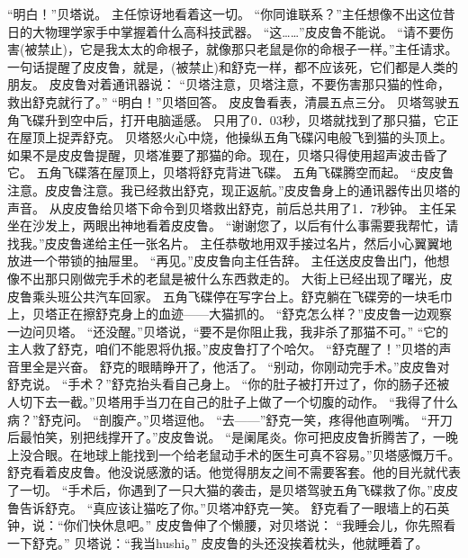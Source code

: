 \documentclass[a4paper,12pt,UTF8,twoside]{ctexbook}
\begin{document}
        “明白！”贝塔说。 
        主任惊讶地看着这一切。 
        “你同谁联系？”主任想像不出这位昔日的大物理学家手中掌握着什么高科技武器。 
        “这……”皮皮鲁不能说。 
        “请不要伤害(被禁止)，它是我太太的命根子，就像那只老鼠是你的命根子一样。”主任请求。 
        一句话提醒了皮皮鲁，就是，(被禁止)和舒克一样，都不应该死，它们都是人类的朋友。 
        皮皮鲁对着通讯器说：  “贝塔注意，贝塔注意，不要伤害那只猫的性命，救出舒克就行了。” 
        “明白！”贝塔回答。 
        皮皮鲁看表，清晨五点三分。 
        贝塔驾驶五角飞碟升到空中后，打开电脑遥感。 
        只用了0．03秒，贝塔就找到了那只猫，它正在屋顶上捉弄舒克。 
        贝塔怒火心中烧，他操纵五角飞碟闪电般飞到猫的头顶上。 
        如果不是皮皮鲁提醒，贝塔准要了那猫的命。现在，贝塔只得使用超声波击昏了它。 
        五角飞碟落在屋顶上，贝塔将舒克背进飞碟。 
        五角飞碟腾空而起。 
        “皮皮鲁注意。皮皮鲁注意。我已经救出舒克，现正返航。”皮皮鲁身上的通讯器传出贝塔的声音。 
        从皮皮鲁给贝塔下命令到贝塔救出舒克，前后总共用了1．7秒钟。 
        主任呆坐在沙发上，两眼出神地看着皮皮鲁。 
        “谢谢您了，以后有什么事需要我帮忙，请找我。”皮皮鲁递给主任一张名片。 
        主任恭敬地用双手接过名片，然后小心翼翼地放进一个带锁的抽屉里。 
        “再见。”皮皮鲁向主任告辞。 
        主任送皮皮鲁出门，他想像不出那只刚做完手术的老鼠是被什么东西救走的。 
        大街上已经出现了曙光，皮皮鲁乘头班公共汽车回家。 
        五角飞碟停在写字台上。舒克躺在飞碟旁的一块毛巾上，贝塔正在擦舒克身上的血迹——大猫抓的。 
        “舒克怎么样？”皮皮鲁一边观察一边问贝塔。 
        “还没醒。”贝塔说，“要不是你阻止我，我非杀了那猫不可。” 
        “它的主人救了舒克，咱们不能恩将仇报。”皮皮鲁打了个哈欠。 
        “舒克醒了！”贝塔的声音里全是兴奋。 
        舒克的眼睛睁开了，他活了。 
        “别动，你刚动完手术。”皮皮鲁对舒克说。 
        “手术？”舒克抬头看自己身上。 
        “你的肚子被打开过了，你的肠子还被人切下去一截。”贝塔用手当刀在自己的肚子上做了一个切腹的动作。 
        “我得了什么病？”舒克问。 
        “剖腹产。”贝塔逗他。 
        “去——”舒克一笑，疼得他直咧嘴。 
        “开刀后最怕笑，别把线撑开了。”皮皮鲁说。 
        “是阑尾炎。你可把皮皮鲁折腾苦了，一晚上没合眼。在地球上能找到一个给老鼠动手术的医生可真不容易。”贝塔感慨万千。 
        舒克看着皮皮鲁。他没说感激的话。他觉得朋友之间不需要客套。他的目光就代表了一切。 
        “手术后，你遇到了一只大猫的袭击，是贝塔驾驶五角飞碟救了你。”皮皮鲁告诉舒克。 
        “真应该让猫吃了你。”贝塔冲舒克一笑。 
        舒克看了一眼墙上的石英钟，说：“你们快休息吧。” 
        皮皮鲁伸了个懒腰，对贝塔说：  “我睡会儿，你先照看一下舒克。” 
        贝塔说：“我当hushi。” 
        皮皮鲁的头还没挨着枕头，他就睡着了。 
\end{document}
